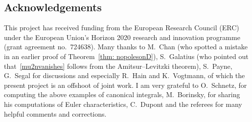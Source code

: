 \documentclass[pdftex]{sigma}%
\numberwithin{equation}{section}
\newcommand{\0}{\color{blue}{\mathsf{0}}}
\begin{document}
\subsection*{Acknowledgements} This project has received funding from the European Research Council (ERC) under the European Union's Horizon 2020 research and innovation programme (grant agreement no.~724638). Many thanks to M.~Chan (who spotted a mistake in an earlier proof of Theorem~\ref{thm: nopolesonD}), S.~Galatius (who pointed out that~\eqref{mu2nvanishes} follows from the Amitsur--Levitzki theorem), S.~Payne, G.~Segal for discussions and especially R.~Hain and K.~Vogtmann, of which the present project is an offshoot of joint work. I am very grateful to O.~Schnetz, for computing the above examples of canonical integrals, M.~Borinsky, for sharing his computations of Euler characteristics, C.~Dupont and the referees for many helpful comments and corrections.
\end{document}
